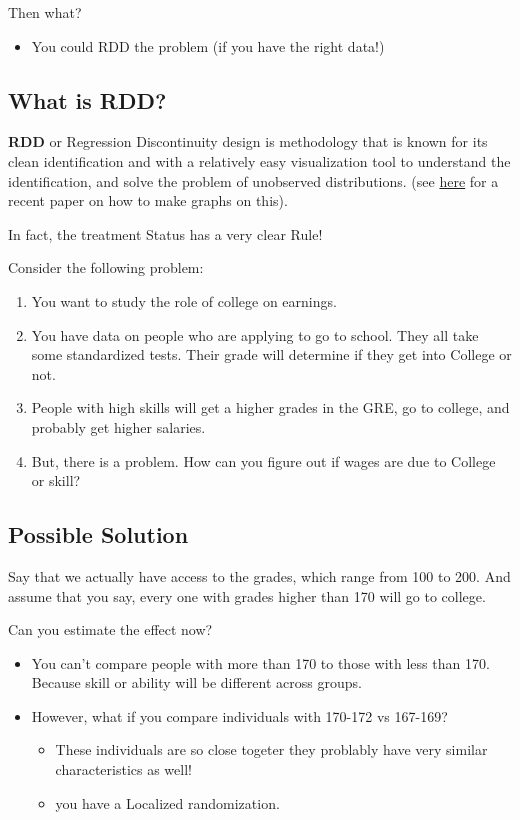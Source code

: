 \documentclass[
  letterpaper,
  DIV=11,
  numbers=noendperiod]{scrartcl}
\providecommand{\tightlist}{%
  \setlength{\itemsep}{0pt}\setlength{\parskip}{0pt}}\usepackage{longtable,booktabs,array}
\begin{document}
Then what?

\begin{itemize}
\tightlist
\item
  You could RDD the problem (if you have the right data!)
\end{itemize}

\subsection{What is RDD?}\label{what-is-rdd}

\textbf{RDD} or Regression Discontinuity design is methodology that is
known for its clean identification and with a relatively easy
visualization tool to understand the identification, and solve the
problem of unobserved distributions. (see
\href{https://academic.oup.com/qje/advance-article/doi/10.1093/qje/qjad011/7068116?login=true}{here}
for a recent paper on how to make graphs on this).

In fact, the treatment Status has a very clear Rule!

Consider the following problem:

\begin{enumerate}
\def\labelenumi{\arabic{enumi}.}
\tightlist
\item
  You want to study the role of college on earnings.
\item
  You have data on people who are applying to go to school. They all
  take some standardized tests. Their grade will determine if they get
  into College or not.
\item
  People with high skills will get a higher grades in the GRE, go to
  college, and probably get higher salaries.
\item
  But, there is a problem. How can you figure out if wages are due to
  College or skill?
\end{enumerate}

\subsection{Possible Solution}\label{possible-solution}

Say that we actually have access to the grades, which range from 100 to
200. And assume that you say, every one with grades higher than 170 will
go to college.

Can you estimate the effect now?

\begin{itemize}
\tightlist
\item
  You can't compare people with more than 170 to those with less than
  170. Because skill or ability will be different across groups.
\item
  However, what if you compare individuals with 170-172 vs 167-169?

  \begin{itemize}
  \tightlist
  \item
    These individuals are so close togeter they problably have very
    similar characteristics as well!
  \item
    you have a Localized randomization.
  \end{itemize}
\end{itemize}
\end{document}
